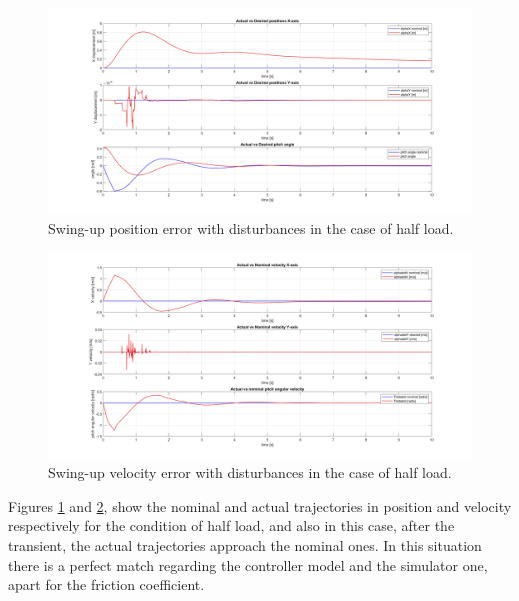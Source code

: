 \begin{figure}
    \centering
    \includegraphics[width=1\linewidth]{Images/Robustness analysis/intermediate load/Swing-Up/Position_error.jpg}
    \caption{Swing-up position error with disturbances in the case of half load.}
    \label{fig:Swing-up position error with disturbances in the case of half load}
\end{figure}

\begin{figure}
    \centering
    \includegraphics[width=1\linewidth]{Images/Robustness analysis/intermediate load/Swing-Up/Velocity_error.jpg}
    \caption{Swing-up velocity error with disturbances in the case of half load.}
    \label{fig:Swing-up velocity error with disturbances in the case of half load}
\end{figure}

Figures \ref{fig:Swing-up position error with disturbances in the case of half load} and \ref{fig:Swing-up velocity error with disturbances in the case of half load}, show the nominal and actual trajectories in position and velocity respectively for the condition of half load, and also in this case, after the transient, the actual trajectories approach the nominal ones.
In this situation there is a perfect match regarding the controller model and the simulator one, apart for the friction coefficient.


